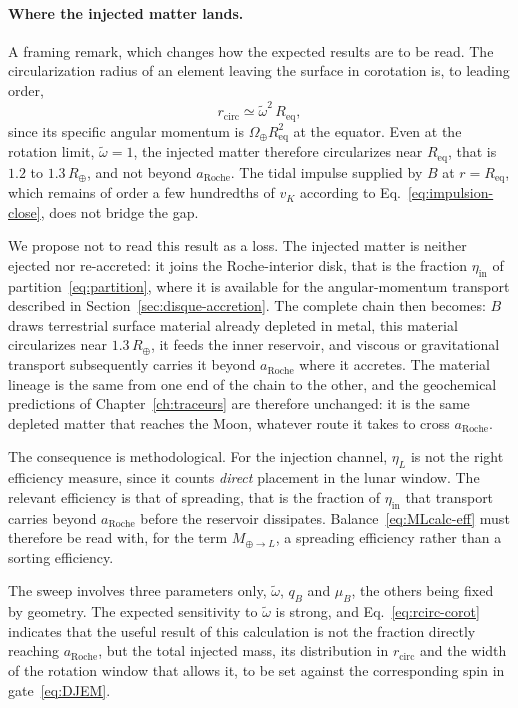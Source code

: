 \documentclass[11pt,a4paper,openany]{report}
\newcommand{\Rt}{R_{\oplus}}
\newcommand{\Req}{R_{\mathrm{eq}}}
\newcommand{\aR}{a_{\mathrm{Roche}}}
\begin{document}
\paragraph{Where the injected matter lands.} A framing remark, which changes how the expected
results are to be read. The circularization radius of an element leaving the surface in corotation
is, to leading order,
\begin{equation}
r_{\mathrm{circ}}\simeq\tilde\omega^2\,\Req,
\label{eq:rcirc-corot}
\end{equation}
since its specific angular momentum is $\Omega_\oplus\Req^2$ at the equator. Even at the rotation
limit, $\tilde\omega=1$, the injected matter therefore circularizes near $\Req$, that is
$1.2$ to $1.3\,\Rt$, and not beyond $\aR$. The tidal impulse supplied by $B$ at $r=\Req$, which
remains of order a few hundredths of $v_K$ according to Eq.~\eqref{eq:impulsion-close}, does not
bridge the gap.

We propose not to read this result as a loss. The injected matter is neither ejected nor
re-accreted: it joins the Roche-interior disk, that is the fraction $\eta_{\mathrm{in}}$ of
partition~\eqref{eq:partition}, where it is available for the angular-momentum transport described
in Section~\ref{sec:disque-accretion}. The complete chain then becomes: $B$ draws terrestrial
surface material already depleted in metal, this material circularizes near $1.3\,\Rt$, it feeds the
inner reservoir, and viscous or gravitational transport subsequently carries it beyond $\aR$ where
it accretes. The material lineage is the same from one end of the chain to the other, and the
geochemical predictions of Chapter~\ref{ch:traceurs} are therefore unchanged: it is the same
depleted matter that reaches the Moon, whatever route it takes to cross $\aR$.

The consequence is methodological. For the injection channel, $\eta_L$ is not the right efficiency
measure, since it counts \emph{direct} placement in the lunar window. The relevant efficiency is
that of spreading, that is the fraction of $\eta_{\mathrm{in}}$ that transport carries beyond $\aR$
before the reservoir dissipates. Balance~\eqref{eq:MLcalc-eff} must therefore be read with, for the
term $M_{\oplus\to L}$, a spreading efficiency rather than a sorting efficiency.

\begin{controle}
The sweep involves three parameters only, $\tilde\omega$, $q_B$ and $\mu_B$, the others being fixed
by geometry. The expected sensitivity to $\tilde\omega$ is strong, and Eq.~\eqref{eq:rcirc-corot}
indicates that the useful result of this calculation is not the fraction directly reaching $\aR$,
but the total injected mass, its distribution in $r_{\mathrm{circ}}$ and the width of the rotation
window that allows it, to be set against the corresponding spin in gate~\eqref{eq:DJEM}.
\end{controle}
\end{document}
